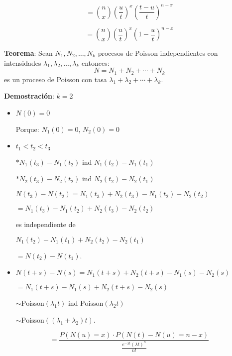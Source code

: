 \documentclass[12pt,a4paper]{article}
\newcommand{\teorema}[1]{%
\begin{teoremabox}
\textbf{Teorema}: #1
\end{teoremabox}
}
\begin{document}
\begin{equation*}
= \binom{n}{x} \left(\frac{u}{t}\right)^x \left(\frac{t-u}{t}\right)^{n-x}
\end{equation*}

\begin{equation*}
= \binom{n}{x} \left(\frac{u}{t}\right)^x \left(1 - \frac{u}{t}\right)^{n-x}
\end{equation*}

\teorema{Sean $N_1, N_2, \ldots, N_k$ procesos de Poisson independientes con intensidades $\lambda_1, \lambda_2, \ldots, \lambda_k$ entonces:
\begin{equation*}
N = N_1 + N_2 + \cdots + N_k
\end{equation*}
es un proceso de Poisson con tasa $\lambda_1 + \lambda_2 + \cdots + \lambda_k$.}

\textbf{Demostración}: $k = 2$

\begin{itemize}
    \item $N(0) = 0$
    
    Porque: $N_1(0) = 0$, $N_2(0) = 0$
    
    \item $t_1 < t_2 < t_3$
    
    $* N_1(t_3) - N_1(t_2)$ ind $N_1(t_2) - N_1(t_1)$
    
    $* N_2(t_3) - N_2(t_2)$ ind $N_2(t_2) - N_2(t_1)$
    
    $N(t_3) - N(t_2) = N_1(t_3) + N_2(t_3) - N_1(t_2) - N_2(t_2)$
    
    $= N_1(t_3) - N_1(t_2) + N_2(t_3) - N_2(t_2)$
    
    es independiente de
    
    $N_1(t_2) - N_1(t_1) + N_2(t_2) - N_2(t_1)$
    
    $= N(t_2) - N(t_1)$.
    
    \item $N(t+s) - N(s) = N_1(t+s) + N_2(t+s) - N_1(s) - N_2(s)$
    
    $= N_1(t+s) - N_1(s) + N_2(t+s) - N_2(s)$
    
    $\sim \text{Poisson}(\lambda_1 t)$ ind $\text{Poisson}(\lambda_2 t)$
    
    $\sim \text{Poisson}((\lambda_1 + \lambda_2)t)$.
\end{itemize}

\begin{equation*}
= \frac{P(N(u) = x) \cdot P(N(t) - N(u) = n - x)}{\frac{e^{-\lambda t} (\lambda t)^n}{n!}}
\end{equation*}
\end{document}
